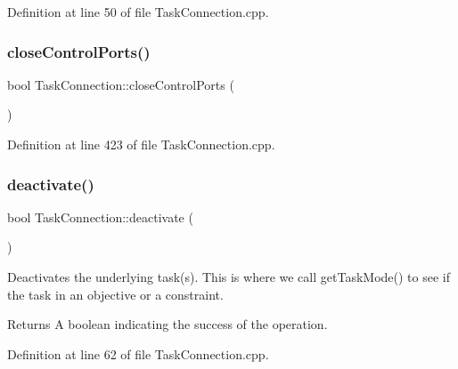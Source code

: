 Definition at line 50 of file Task\+Connection.\+cpp.

\hypertarget{classocra__recipes_1_1TaskConnection_abc322bd749033fad00193ca63701a1f5}{}\label{classocra__recipes_1_1TaskConnection_abc322bd749033fad00193ca63701a1f5} 
\subsubsection{\texorpdfstring{close\+Control\+Ports()}{closeControlPorts()}}
{\footnotesize\ttfamily bool Task\+Connection\+::close\+Control\+Ports (\begin{DoxyParamCaption}{ }\end{DoxyParamCaption})}



Definition at line 423 of file Task\+Connection.\+cpp.

\hypertarget{classocra__recipes_1_1TaskConnection_a8488250380b7fd9598f3246ec6111d6a}{}\label{classocra__recipes_1_1TaskConnection_a8488250380b7fd9598f3246ec6111d6a} 
\subsubsection{\texorpdfstring{deactivate()}{deactivate()}}
{\footnotesize\ttfamily bool Task\+Connection\+::deactivate (\begin{DoxyParamCaption}{ }\end{DoxyParamCaption})}

Deactivates the underlying task(s). This is where we call get\+Task\+Mode() to see if the task in an objective or a constraint.

\begin{DoxyReturn}{Returns}
A boolean indicating the success of the operation. 
\end{DoxyReturn}


Definition at line 62 of file Task\+Connection.\+cpp.

\hypertarget{classocra__recipes_1_1TaskConnection_a7d659e4a155f8a0942bb71d193b95385}{}\label{classocra__recipes_1_1TaskConnection_a7d659e4a155f8a0942bb71d193b95385} 
